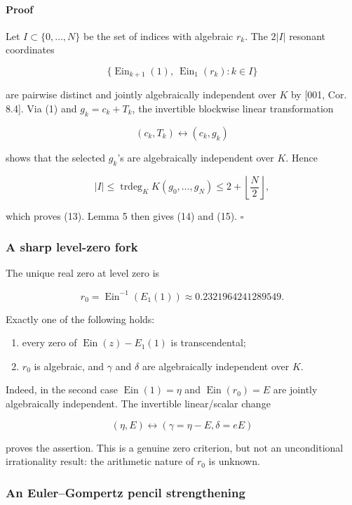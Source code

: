 \documentclass[11pt]{article}
\theoremstyle{keio}
\theoremstyle{definition}
\theoremstyle{remark}
\newcommand{\Ein}{\operatorname{Ein}}
\providecommand{\tightlist}{\setlength{\itemsep}{0pt}\setlength{\parskip}{0pt}}
\begin{document}
\paragraph{Proof}

Let \(I\subset\{0,\ldots,N\}\) be the set of indices with algebraic
\(r_k\). The \(2|I|\) resonant coordinates

\[
 \bigl\{\Ein_{k+1}(1),\ \Ein_1(r_k):k\in I\bigr\}
\]

are pairwise distinct and jointly algebraically independent over \(K\) by
{[}001, Cor. 8.4{]}. Via (1) and \(g_k=c_k+T_k\), the invertible blockwise
linear transformation

\[
 (c_k,T_k)\longleftrightarrow(c_k,g_k)
\]

shows that the selected \(g_k\)'s are algebraically independent over
\(K\). Hence

\[
 |I|\le\operatorname{trdeg}_K K(g_0,\ldots,g_N)
 \le2+\left\lfloor\frac N2\right\rfloor,
\]

which proves (13). Lemma 5 then gives (14) and (15). \(\square\)

\subsubsection{A sharp level-zero fork}

The unique real zero at level zero is

\[
 r_0=\Ein^{-1}(E_1(1))\approx0.2321964241289549.
\]

Exactly one of the following holds:

\begin{enumerate}
\def\labelenumi{\arabic{enumi}.}
\tightlist
\item
  every zero of \(\Ein(z)-E_1(1)\) is transcendental;
\item
  \(r_0\) is algebraic, and \(\gamma\) and \(\delta\) are algebraically
  independent over \(K\).
\end{enumerate}

Indeed, in the second case \(\Ein(1)=\eta\) and \(\Ein(r_0)=E\) are jointly
algebraically independent. The invertible linear/scalar change

\[
 (\eta,E)\longleftrightarrow(\gamma=\eta-E,\delta=eE)
\]

proves the assertion. This is a genuine zero criterion, but not an
unconditional irrationality result: the arithmetic nature of \(r_0\) is
unknown.

\subsubsection{An Euler--Gompertz pencil strengthening}
\end{document}
